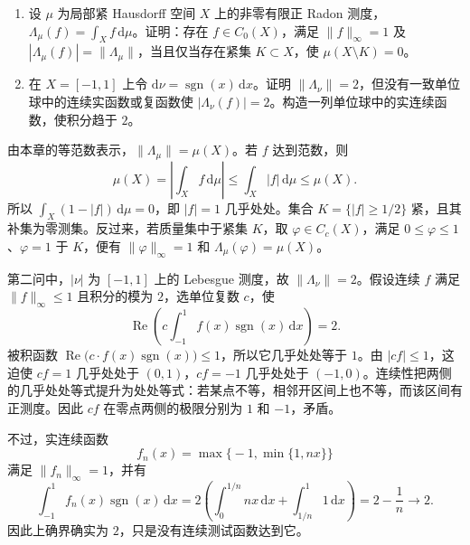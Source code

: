 \begin{optionalexercise}\label{b1:ex:11-norm-attainment}
\begin{enumerate}
\item\label{b1:item:11-positive-attainment}
设 \(\mu\) 为局部紧 Hausdorff 空间 \(X\) 上的非零有限正 Radon 测度，\(\Lambda_\mu(f)=\int_Xf\,\mathrm d\mu\)。证明：存在 \(f\in C_0(X)\)，满足 \(\|f\|_\infty=1\) 及 \(|\Lambda_\mu(f)|=\|\Lambda_\mu\|\)，当且仅当存在紧集 \(K\subset X\)，使 \(\mu(X\setminus K)=0\)。
\item\label{b1:item:11-signed-nonattainment}
在 \(X=[-1,1]\) 上令 \(\mathrm d\nu=\operatorname{sgn}(x)\,\mathrm dx\)。证明 \(\|\Lambda_\nu\|=2\)，但没有一致单位球中的连续实函数或复函数使 \(|\Lambda_\nu(f)|=2\)。构造一列单位球中的实连续函数，使积分趋于 \(2\)。
\end{enumerate}
\end{optionalexercise}
\begin{solution}
由本章的等范数表示，\(\|\Lambda_\mu\|=\mu(X)\)。若 \(f\) 达到范数，则
\[
 \mu(X)=\left|\int_Xf\,\mathrm d\mu\right|
 \le\int_X|f|\,\mathrm d\mu\le\mu(X).
\]
所以 \(\int_X(1-|f|)\,\mathrm d\mu=0\)，即 \(|f|=1\) 几乎处处。集合 \(K=\{|f|\ge1/2\}\) 紧，且其补集为零测集。反过来，若质量集中于紧集 \(K\)，取 \(\varphi\in C_c(X)\)，满足 \(0\le\varphi\le1\)、\(\varphi=1\) 于 \(K\)，便有 \(\|\varphi\|_\infty=1\) 和 \(\Lambda_\mu(\varphi)=\mu(X)\)。

第二问中，\(|\nu|\) 为 \([-1,1]\) 上的 Lebesgue 测度，故 \(\|\Lambda_\nu\|=2\)。假设连续 \(f\) 满足 \(\|f\|_\infty\le1\) 且积分的模为 \(2\)，选单位复数 \(c\)，使
\[
 \operatorname{Re}\left(c\int_{-1}^1f(x)\operatorname{sgn}(x)\,\mathrm dx\right)=2.
\]
被积函数 \(\operatorname{Re}\bigl(c\cdot f(x)\operatorname{sgn}(x)\bigr)\le1\)，所以它几乎处处等于 \(1\)。由 \(|cf|\le1\)，这迫使 \(cf=1\) 几乎处处于 \((0,1)\)，\(cf=-1\) 几乎处处于 \((-1,0)\)。连续性把两侧的几乎处处等式提升为处处等式：若某点不等，相邻开区间上也不等，而该区间有正测度。因此 \(cf\) 在零点两侧的极限分别为 \(1\) 和 \(-1\)，矛盾。

不过，实连续函数
\[
 f_n(x)=\max\bigl\{-1,\min\{1,nx\}\bigr\}
\]
满足 \(\|f_n\|_\infty=1\)，并有
\[
 \int_{-1}^1 f_n(x)\operatorname{sgn}(x)\,\mathrm dx
 =2\left(\int_0^{1/n}nx\,\mathrm dx+\int_{1/n}^1 1\,\mathrm dx\right)
 =2-\frac1n\longrightarrow2.
\]
因此上确界确实为 \(2\)，只是没有连续测试函数达到它。
\end{solution}
